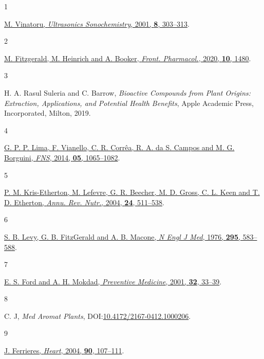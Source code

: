 \documentclass[
  letterpaper,
  DIV=11,
  numbers=noendperiod]{scrartcl}
\newlength{\cslhangindent}
\newlength{\csllabelwidth}
\newenvironment{CSLReferences}[2] %
 {\begin{list}{}{%
  \setlength{\itemindent}{0pt}
  \setlength{\leftmargin}{0pt}
  \setlength{\parsep}{0pt}
  \ifodd #1
   \setlength{\leftmargin}{\cslhangindent}
   \setlength{\itemindent}{-1\cslhangindent}
  \fi
  \setlength{\itemsep}{#2\baselineskip}}}
 {\end{list}}
\newcommand{\CSLLeftMargin}[1]{\parbox[t]{\csllabelwidth}{\strut#1\strut}}
\newcommand{\CSLRightInline}[1]{\parbox[t]{\linewidth - \csllabelwidth}{\strut#1\strut}}
\begin{document}
\label{refs}
\begin{CSLReferences}{0}{0}
\CSLLeftMargin{1 }%
\CSLRightInline{\href{https://doi.org/10.1016/S1350-4177(01)00071-2}{M.
Vinatoru, \emph{Ultrasonics Sonochemistry}, 2001, \textbf{8},
303--313}.}

\CSLLeftMargin{2 }%
\CSLRightInline{\href{https://doi.org/10.3389/fphar.2019.01480}{M.
Fitzgerald, M. Heinrich and A. Booker, \emph{Front. Pharmacol.}, 2020,
\textbf{10}, 1480}.}

\CSLLeftMargin{3 }%
\CSLRightInline{H. A. Rasul Suleria and C. Barrow, \emph{Bioactive
{Compounds} from {Plant Origins}: {Extraction}, {Applications}, and
{Potential Health Benefits}}, {Apple Academic Press, Incorporated},
{Milton}, 2019.}

\CSLLeftMargin{4 }%
\CSLRightInline{\href{https://doi.org/10.4236/fns.2014.511117}{G. P. P.
Lima, F. Vianello, C. R. Corrêa, R. A. da S. Campos and M. G. Borguini,
\emph{FNS}, 2014, \textbf{05}, 1065--1082}.}

\CSLLeftMargin{5 }%
\CSLRightInline{\href{https://doi.org/10.1146/annurev.nutr.23.011702.073237}{P.
M. Kris-Etherton, M. Lefevre, G. R. Beecher, M. D. Gross, C. L. Keen and
T. D. Etherton, \emph{Annu. Rev. Nutr.}, 2004, \textbf{24}, 511--538}.}

\CSLLeftMargin{6 }%
\CSLRightInline{\href{https://doi.org/10.1056/NEJM197609092951103}{S. B.
Levy, G. B. FitzGerald and A. B. Macone, \emph{N Engl J Med}, 1976,
\textbf{295}, 583--588}.}

\CSLLeftMargin{7 }%
\CSLRightInline{\href{https://doi.org/10.1006/pmed.2000.0772}{E. S. Ford
and A. H. Mokdad, \emph{Preventive Medicine}, 2001, \textbf{32},
33--39}.}

\CSLLeftMargin{8 }%
\CSLRightInline{C. J, \emph{Med Aromat Plants},
DOI:\href{https://doi.org/10.4172/2167-0412.1000206}{10.4172/2167-0412.1000206}.}

\CSLLeftMargin{9 }%
\CSLRightInline{\href{https://doi.org/10.1136/heart.90.1.107}{J.
Ferrieres, \emph{Heart}, 2004, \textbf{90}, 107--111}.}


\end{CSLReferences}
\end{document}
